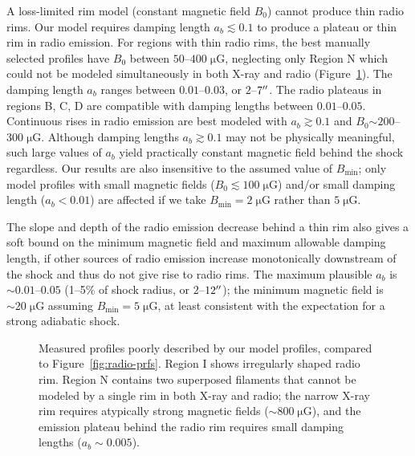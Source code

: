 \documentclass[iop, apj, numberedappendix]{emulateapj}
\newcommand*{\mt}{\mathrm}
\newcommand*{\unit}[1]{\;\mt{#1}}  %
\newcommand*{\abt}{\mathord{\sim}} %
\newcommand*{\Bmin}{B_{\mt{min}}}
\newcommand*{\muG}{\unit{\mu G}}
\begin{document}
A loss-limited rim model (constant magnetic field $B_0$) cannot produce thin
radio rims.  Our model requires damping length $a_b \lesssim 0.1$ to produce a
plateau or thin rim in radio emission.  For regions with thin radio rims, the
best manually selected profiles have $B_0$ between $50$--$400 \muG$, neglecting
only Region N which could not be modeled simultaneously in both X-ray and radio
(Figure~\ref{fig:radio-prfs-meh}).  The damping length $a_b$ ranges between
$0.01$--$0.03$, or $2$--$7\mbox{$^{\prime\prime}$}$.  The radio plateaus in regions B, C, D are
compatible with damping lengths between $0.01$--$0.05$.  Continuous rises in
radio emission are best modeled with $a_b \gtrsim 0.1$ and $B_0 \abt 200$--$300
\muG$.  Although damping lengths $a_b \gtrsim 0.1$ may not be physically
meaningful, such large values of $a_b$ yield practically constant magnetic
field behind the shock regardless.
Our results are also insensitive to the assumed value of $\Bmin$; only model
profiles with small magnetic fields ($B_0 \lesssim 100 \muG$) and/or small
damping length ($a_b < 0.01$) are affected if we take $\Bmin = 2 \muG$ rather
than $5 \muG$.

The slope and depth of the radio emission decrease behind a thin rim also
gives a soft bound on the minimum magnetic field and maximum allowable damping
length, if other sources of radio emission increase monotonically downstream of
the shock and thus do not give rise to radio rims.  The maximum plausible $a_b$
is $\abt 0.01$--$0.05$ (1--5\% of shock radius, or $2$--$12\mbox{$^{\prime\prime}$}$); the
minimum magnetic field is $\abt 20 \muG$ assuming $\Bmin = 5 \muG$, at least
consistent with the expectation for a strong adiabatic shock.

\begin{figure}
    \centering
    \iftoggle{manuscript}{
        \epsscale{0.8}
        \plotone{figures/radio-fits-I.pdf} \\
        \plotone{figures/radio-fits-N.pdf}
        \epsscale{1}
    }{
        \texttt{[image: figures/radio-fits-I.pdf]} \\
        \texttt{[image: figures/radio-fits-N.pdf]}
    }
    \caption{Measured profiles poorly described by our model profiles, compared
    to Figure~\ref{fig:radio-prfs}.  Region I shows irregularly shaped radio
    rim.  Region N contains two superposed filaments that cannot be modeled by
    a single rim in both X-ray and radio; the narrow X-ray rim requires
    atypically strong magnetic fields ($\sim 800 \muG$), and the emission
    plateau behind the radio rim requires small damping lengths ($a_b \sim
    0.005$).
    \label{fig:radio-prfs-meh}}
\end{figure}
\end{document}
